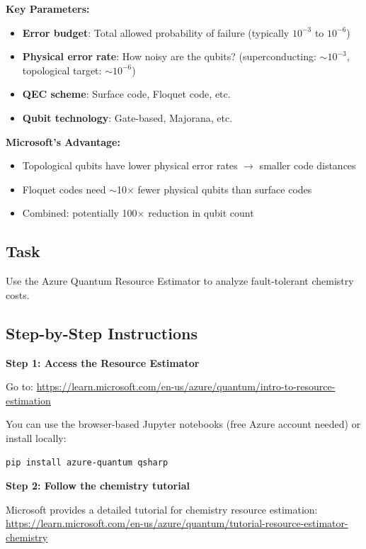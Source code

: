 \documentclass[11pt,a4paper]{article}
\begin{document}
\textbf{Key Parameters:}
\begin{itemize}
    \item \textbf{Error budget}: Total allowed probability of failure (typically $10^{-3}$ to $10^{-6}$)
    \item \textbf{Physical error rate}: How noisy are the qubits? (superconducting: $\sim 10^{-3}$, topological target: $\sim 10^{-6}$)
    \item \textbf{QEC scheme}: Surface code, Floquet code, etc.
    \item \textbf{Qubit technology}: Gate-based, Majorana, etc.
\end{itemize}

\textbf{Microsoft's Advantage:}
\begin{itemize}
    \item Topological qubits have lower physical error rates $\to$ smaller code distances
    \item Floquet codes need $\sim$10$\times$ fewer physical qubits than surface codes
    \item Combined: potentially 100$\times$ reduction in qubit count
\end{itemize}

\subsection*{Task}
Use the Azure Quantum Resource Estimator to analyze fault-tolerant chemistry costs.

\subsection*{Step-by-Step Instructions}

\textbf{Step 1: Access the Resource Estimator}

Go to: \url{https://learn.microsoft.com/en-us/azure/quantum/intro-to-resource-estimation}

You can use the browser-based Jupyter notebooks (free Azure account needed) or install locally:
\begin{lstlisting}[language=bash]
pip install azure-quantum qsharp
\end{lstlisting}

\textbf{Step 2: Follow the chemistry tutorial}

Microsoft provides a detailed tutorial for chemistry resource estimation:
\url{https://learn.microsoft.com/en-us/azure/quantum/tutorial-resource-estimator-chemistry}
\end{document}
